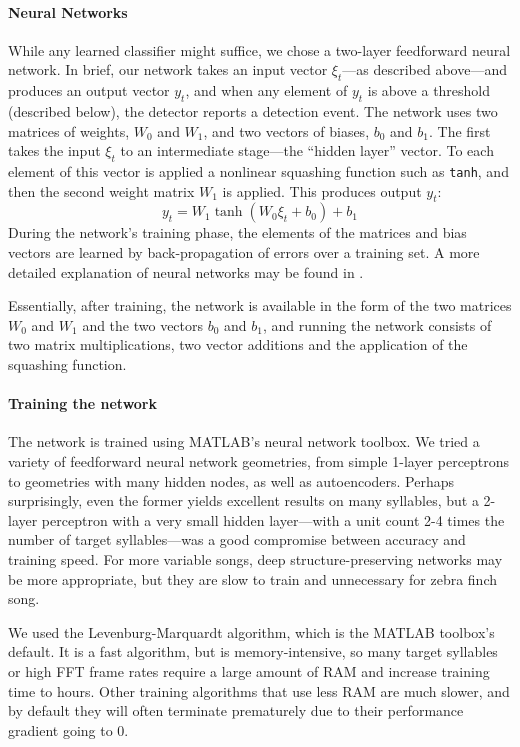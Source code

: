 \documentclass[10pt,letterpaper]{article}
\renewcommand{\subsubsection}[1]{\paragraph{#1}}
\begin{document}
\subsubsection{Neural Networks}

While any learned classifier might suffice, we chose a two-layer
feedforward neural network.  In brief, our network takes an input
vector $\xi_t$---as described above---and produces an output vector
$y_t$, and when any element of $y_t$ is above a threshold (described
below), the detector reports a detection event.  The network uses two
matrices of weights, $W_0$ and $W_1$, and two vectors of biases, $b_0$
and $b_1$.  The first takes the input $\xi_t$ to an intermediate
stage---the ``hidden layer'' vector.  To each element of this vector
is applied a nonlinear squashing function such as {\tt tanh}, and then
the second weight matrix $W_1$ is applied.  This produces output
$y_t$:
\begin{equation*}
  y_t = W_1 \tanh (W_0 \xi_t + b_0) + b_1
\end{equation*}
During the network's training phase, the elements of the matrices and bias vectors are learned by back-propagation of errors
over a training set.  A more detailed explanation of neural networks
may be found in \cite{hkp}.

Essentially, after training, the network is available in the form of
the two matrices $W_0$ and $W_1$ and the two vectors $b_0$ and $b_1$,
and running the network consists of two matrix multiplications, two
vector additions and the application of the squashing function.

\subsubsection{Training the network}

The network is trained using MATLAB's neural network toolbox. We tried
a variety of feedforward neural network geometries, from simple
1-layer perceptrons to geometries with many hidden nodes, as well as
autoencoders. Perhaps surprisingly, even the former yields excellent
results on many syllables, but a 2-layer perceptron with a very small
hidden layer---with a unit count 2-4 times the number of target
syllables---was a good compromise between accuracy and training
speed. For more variable songs, deep structure-preserving networks may
be more appropriate, but they are slow to train and unnecessary for
zebra finch song.

We used the Levenburg-Marquardt algorithm, which is the MATLAB
toolbox's default.  It is a fast algorithm, but is memory-intensive,
so many target syllables or high FFT frame rates require a large
amount of RAM and increase training time to hours. Other training
algorithms that use less RAM are much slower, and by default they will
often terminate prematurely due to their performance gradient going to
0.
\end{document}
